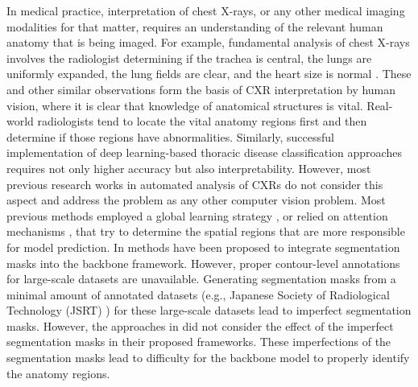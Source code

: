 \documentclass[journal]{IEEEtran}
\begin{document}
In medical practice, interpretation of chest X-rays, or any other medical imaging modalities for that matter, requires an understanding of the relevant human anatomy that is being imaged. For example, fundamental analysis of chest X-rays involves the radiologist determining if the trachea is central, the lungs are uniformly expanded, the lung fields are clear, and the heart size is normal \cite{clarke2017chest}. These and other similar observations form the basis of CXR interpretation by human vision, where it is clear that knowledge of anatomical structures is vital. Real-world radiologists tend to locate the vital anatomy regions first and then determine if those regions have abnormalities. Similarly, successful implementation of deep learning-based thoracic disease classification approaches requires not only higher accuracy but also interpretability. However, most previous research works in automated analysis of CXRs do not consider this aspect and address the problem as any other computer vision problem. Most previous methods employed a global learning strategy \cite{8099852, Rajpurkar2017CheXNetRP}, or relied on attention mechanisms \cite{Tang2018AttentionGuidedCL, Chen2020LesionLA, Yan2018WeaklySD}, that try to determine the spatial regions that are more responsible for model prediction. In \cite{XU202196, Keidar2021, liu2019sdfn, ARIASGARZON2021100138} methods have been proposed to integrate segmentation masks into the backbone framework. However, proper contour-level annotations for large-scale datasets \cite{8099852, irvin2019chexpert, johnson2019mimiccxrjpg} are unavailable. Generating segmentation masks from a minimal amount of annotated datasets (e.g., Japanese Society of Radiological Technology (JSRT) \cite{Shiraishi2000DevelopmentOA}) for these large-scale datasets lead to imperfect segmentation masks. However, the approaches in \cite{XU202196, Keidar2021, liu2019sdfn, ARIASGARZON2021100138} did not consider the effect of the imperfect segmentation masks in their proposed frameworks. These imperfections of the segmentation masks lead to difficulty for the backbone model to properly identify the anatomy regions. \par
\end{document}
